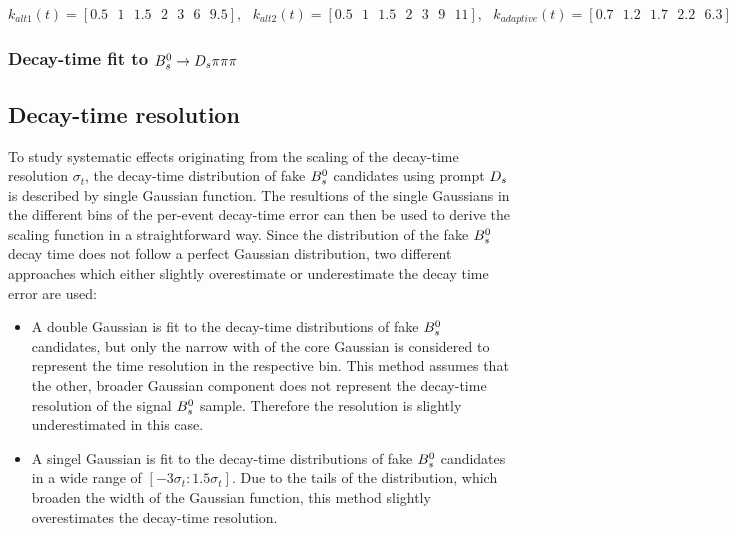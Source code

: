 \[ k_{alt1}(t) =  [0.5\mbox{ } 1 \mbox{ }1.5 \mbox{ }2 \mbox{ }3 \mbox{ }6 \mbox{ }9.5], 
\mbox{ } k_{alt2}(t) =  [0.5 \mbox{ } 1\mbox{ }  1.5 \mbox{ } 2 \mbox{ } 3\mbox{ }  9\mbox{ } 11],  
\mbox{ } k_{adaptive}(t) =  [0.7\mbox{ } 1.2\mbox{ } 1.7\mbox{ } 2.2\mbox{ } 6.3] \]





\subsubsection{Decay-time fit to ${{B}^0_{s}}\rightarrow{\ensuremath{{D}_{s}}}{\ensuremath{\pi}}{\ensuremath{\pi}}{\ensuremath{\pi}}$} 




\subsection{Decay-time resolution}

To study systematic effects originating from the scaling of the decay-time resolution $\sigma_{t}$, the decay-time distribution of fake ${{B}^0_{s}}$ candidates using prompt ${{D}_{s}}$ is described by single Gaussian function.
The resultions of the single Gaussians in the different bins of the per-event decay-time error can then be used to derive the scaling function in a straightforward way.
Since the distribution of the fake ${{B}^0_{s}}$ decay time does not follow a perfect Gaussian distribution, two different approaches which either slightly overestimate or underestimate the decay time error are used:

\begin{itemize}

\item A double Gaussian is fit to the decay-time distributions of fake ${{B}^0_{s}}$ candidates, but only the narrow with of the core Gaussian is considered to represent the time resolution in the respective bin. 
This method assumes that the other, broader Gaussian component does not represent the decay-time resolution of the signal ${{B}^0_{s}}$ sample. Therefore the resolution is slightly underestimated in this case.

\item A singel Gaussian is fit to the decay-time distributions of fake ${{B}^0_{s}}$ candidates in a wide range of $[-3\sigma_{t} : 1.5\sigma_{t}]$. 
Due to the tails of the distribution, which broaden the width of the Gaussian function, this method slightly overestimates the decay-time resolution.   

\end{itemize}

